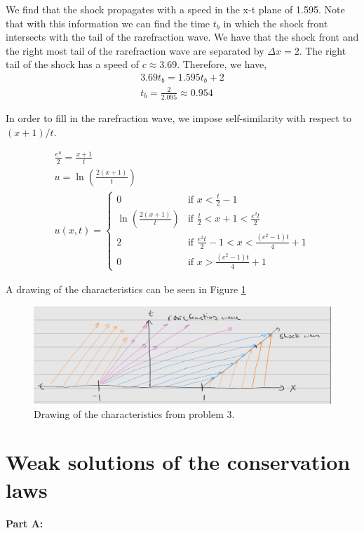 \documentclass{article}
\begin{document}
We find that the shock propagates with a speed in the x-t plane of 1.595. Note
that with this information we can find the time $t_b$ in which the shock front
intersects with the tail of the rarefraction wave. We have that the shock front
and the right most tail of the rarefraction wave are separated by $\Delta x =
2$. The right tail of the shock has a speed of $c \approx 3.69$. Therefore, we
have,
\begin{gather*}
    3.69t_b = 1.595t_b + 2\\
    t_b = \frac{2}{2.095} \approx 0.954
\end{gather*}

In order to fill in the rarefraction wave, we impose self-similarity
with respect to $(x+1)/t$.

\begin{gather*}
    \frac{e^u}{2} = \frac{x+1}{t}\\
    u = \ln\left(\frac{2(x+1)}{t}\right)\\
    u(x,t) = \begin{cases}
        0 & \text{if } x < \frac{t}{2} - 1\\
        \ln\left(\frac{2(x+1)}{t}\right)& \text{if } \frac{t}{2} < x +1 < \frac{e^2t}{2}\\
        2 & \text{if } \frac{e^2t}{2} - 1 < x < \frac{(e^2-1)t}{4} + 1\\
        0 & \text{if } x > \frac{(e^2-1)t}{4} +1\end{cases}
\end{gather*}

A drawing of the characteristics can be seen in Figure \ref{fig:p3_drawing}
\begin{figure}[t]
    \centering
    \includegraphics[width=.7\textwidth]{prob3_drawing.jpg}
    \caption{Drawing of the characteristics from problem 3.}
    \label{fig:p3_drawing}
\end{figure}

\section{Weak solutions of the conservation laws}

\textbf{Part A:}
\end{document}
